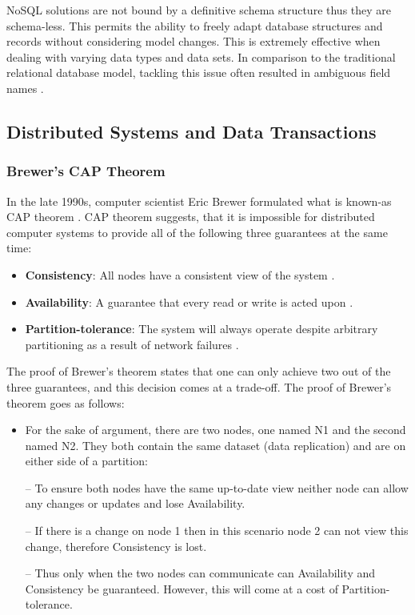 NoSQL solutions are not bound by a definitive schema structure thus they are schema-less. This permits the ability to freely adapt database structures and records without considering model changes. This is extremely effective when dealing with varying data types and data sets. In comparison to the traditional relational database model, tackling this issue often resulted in ambiguous field names  \cite{nosql1}.

\subsection{Distributed Systems and Data Transactions}\label{distrosystems}
\subsubsection{Brewer's CAP Theorem}\label{cap}
In the late 1990s, computer scientist Eric Brewer formulated what is known-as CAP theorem \cite{toad}. CAP theorem suggests, that it is impossible for distributed computer systems to provide all of the following three guarantees at the same time:
\begin{itemize}
\item \textbf{Consistency}: All nodes have a consistent view of the system \cite{toad}.
\item \textbf{Availability}: A guarantee that every read or write is acted upon \cite{toad}.
\item \textbf{Partition-tolerance}: The system will always operate despite arbitrary partitioning as a result of network failures \cite{toad}.
\end{itemize}
The proof of Brewer's theorem states that one can only achieve two out of the three guarantees, and this decision comes at a trade-off. The proof of Brewer's theorem goes as follows:
\begin{itemize}[leftmargin=*]
\item For the sake of argument, there are two nodes, one named N1 and the second named N2. They both contain the same dataset (data replication) and are on either side of a partition:
\end{itemize}
\begin{itemize}
\item[--] To ensure both nodes have the same up-to-date view neither node can allow any changes or updates and lose Availability.
\item[--] If there is a change on node 1 then in this scenario node 2 can not view this change, therefore Consistency is lost.
\item[--] Thus only when the two nodes can communicate can Availability and Consistency be guaranteed. However, this will come at a cost of Partition-tolerance.
\end{itemize}
